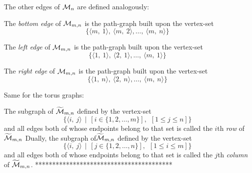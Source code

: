 {\begin{itemize}
The other edges of $\mbox{$\cal M$}_n$ are defined analogously:

\medskip

The {\it bottom edge} of $\mbox{$\cal M$}_{m,n}$ is the path-graph built upon the
vertex-set
\[ \{ \langle m, \ 1 \rangle, \ \langle m, \ 2 \rangle, \ldots, \
\langle m, \ n \rangle \}
\]

The {\it left edge} of $\mbox{$\cal M$}_{m,n}$ is the path-graph built upon the
vertex-set
\[ \{ \langle 1, \ 1 \rangle, \ \langle 2, \ 1 \rangle, \ldots, \
\langle m, \ 1 \rangle \}
\]

The {\it right edge} of $\mbox{$\cal M$}_{m,n}$ is the path-graph built upon the
vertex-set
\[ \{ \langle 1, \ n \rangle, \ \langle 2, \ n \rangle, \ldots, \
\langle m, \ n \rangle \}
\]
\end{itemize}
\medskip

Same for the torus graphs:

The subgraph of $\widetilde{\mbox{$\cal M$}}_{m,n}$ defined by the vertex-set
\[ \{ \langle i, \ j \rangle  \ \ | \ \ \left[i \in \{1, 2, \ldots,
  m\}\right], \ \ \left[1 \leq j \leq n\right]\}
\]
and all edges both of whose endpoints belong to that set is called the
$i$th {\it row} of $\widetilde{\mbox{$\cal M$}}_{m,n}$
Dually, the subgraph of$\widetilde{\mbox{$\cal M$}}_{m,n}$ defined by the vertex-set
\[ \{ \langle i, \ j \rangle  \ \ | \ \ \left[j \in \{1, 2, \ldots,
  n\}\right], \ \ \left[1 \leq i \leq m\right] \}
\]
and all edges both of whose endpoints belong to that set is called the
$j$th {\it column} of $\widetilde{\mbox{$\cal M$}}_{m,n}$.
%
****************************************}


